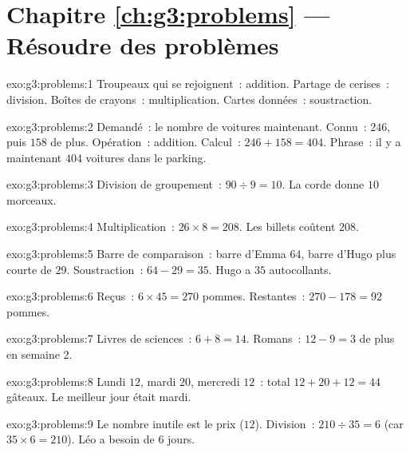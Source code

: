 \section*{Chapitre \ref{ch:g3:problems} --- Résoudre des problèmes}

\begin{solution}{exo:g3:problems:1}
Troupeaux qui se rejoignent~: addition. Partage de cerises~:
division. Boîtes de crayons~: multiplication. Cartes données~:
soustraction.
\end{solution}

\begin{solution}{exo:g3:problems:2}
Demandé~: le nombre de voitures maintenant. Connu~: $246$, puis
$158$ de plus. Opération~: addition. Calcul~:
$246 + 158 = 404$. Phrase~: il y a maintenant $404$ voitures dans le
parking.
\end{solution}

\begin{solution}{exo:g3:problems:3}
Division de groupement~: $90 \div 9 = 10$. La corde donne $10$
morceaux.
\end{solution}

\begin{solution}{exo:g3:problems:4}
Multiplication~: $26 \times 8 = 208$. Les billets coûtent $208$.
\end{solution}

\begin{solution}{exo:g3:problems:5}
Barre de comparaison~: barre d'Emma $64$, barre d'Hugo plus courte de
$29$. Soustraction~: $64 - 29 = 35$. Hugo a $35$ autocollants.
\end{solution}

\begin{solution}{exo:g3:problems:6}
Reçus~: $6 \times 45 = 270$ pommes. Restantes~:
$270 - 178 = 92$ pommes.
\end{solution}

\begin{solution}{exo:g3:problems:7}
Livres de sciences~: $6 + 8 = 14$. Romans~: $12 - 9 = 3$ de plus en
semaine 2.
\end{solution}

\begin{solution}{exo:g3:problems:8}
Lundi $12$, mardi $20$, mercredi $12$~: total
$12 + 20 + 12 = 44$ gâteaux. Le meilleur jour était mardi.
\end{solution}

\begin{solution}{exo:g3:problems:9}
Le nombre inutile est le prix ($12$). Division~:
$210 \div 35 = 6$ (car $35 \times 6 = 210$). Léo a besoin de $6$
jours.
\end{solution}

